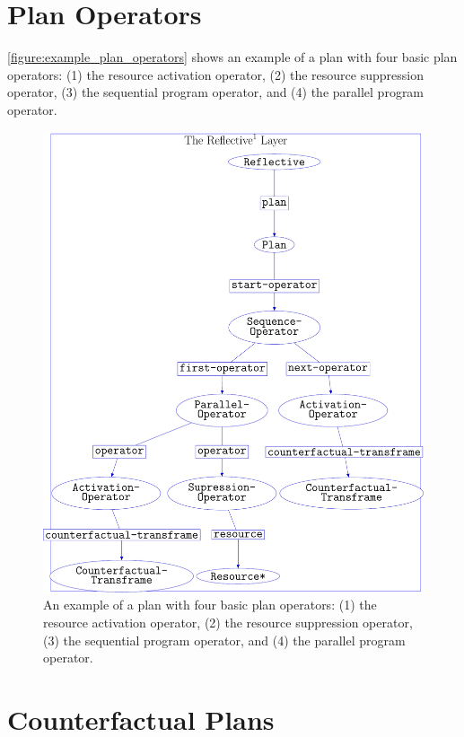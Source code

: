 \section{Plan Operators}

{\mbox{\autoref{figure:example_plan_operators}}} shows an example of a
plan with four basic plan operators: (1) the resource activation
operator, (2) the resource suppression operator, (3) the sequential
program operator, and (4) the parallel program operator.
\begin{figure}
\hspace*{-4cm}\includegraphics[width=18cm]{gfx/example_plan_operators}
\caption[An example of a plan with four basic plan operators.]{An
  example of a plan with four basic plan operators: (1) the resource
  activation operator, (2) the resource suppression operator, (3) the
  sequential program operator, and (4) the parallel program operator.}
\label{figure:example_plan_operators}
\end{figure}



\section{Counterfactual Plans}

